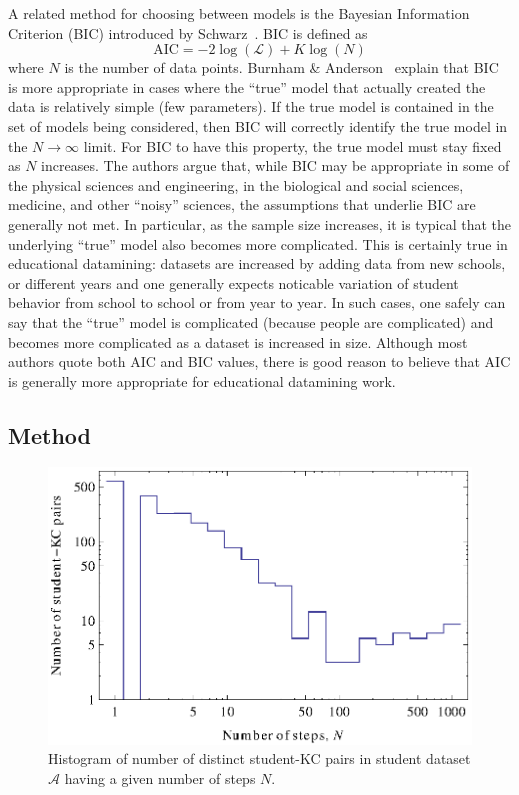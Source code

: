 \documentclass{acmlarge-edm}
\begin{document}
A related method for choosing between models is the Bayesian
Information Criterion (BIC) introduced by
Schwarz~\citeyear{schwarz_estimating_1978}.  BIC is defined as
%
\begin{equation}
   \mathrm{AIC}= -2 \log\left(\mathcal{L}\right) + K \log\left(N\right)
\end{equation}
% 
where $N$ is the number of data points.
Burnham \& Anderson~\citeyear[Sections~6.3 \& 6.4]{burnham_model_2002} explain
that BIC is more appropriate in cases where the ``true'' model that
actually created the data is relatively simple (few parameters).  If
the true model is contained in the set of models being considered,
then BIC will correctly identify the true model in the $N\to\infty$
limit.  For BIC to have this property, the true model must stay fixed as 
$N$ increases.  
The authors argue that, while BIC may be appropriate in some
of the physical sciences and engineering, in the biological and social
sciences, medicine, and other ``noisy'' sciences, the assumptions that
underlie BIC are generally not met.  In particular, as the sample size
increases, it is typical that the underlying ``true'' model also
becomes more complicated.  This is certainly true in educational
datamining: datasets are increased by adding data from new schools, or
different years and one generally expects noticable variation of student
behavior from school to school or from year to year.  In such cases, one
safely can say that the ``true'' model is complicated (because people are
complicated) and becomes more complicated as a dataset is increased in
size.  Although most authors quote both AIC and BIC values, there
is good reason to believe that AIC is generally more appropriate for
educational datamining work.

\subsection{Method}


\begin{figure}
  \centering \includegraphics{student-kc-length-histogram.eps}
  \caption{Histogram of number of distinct student-KC pairs in student 
    dataset $\mathcal{A}$ having a given number of steps $N$.}
    \label{student-length-histogram}
\end{figure}
\end{document}
